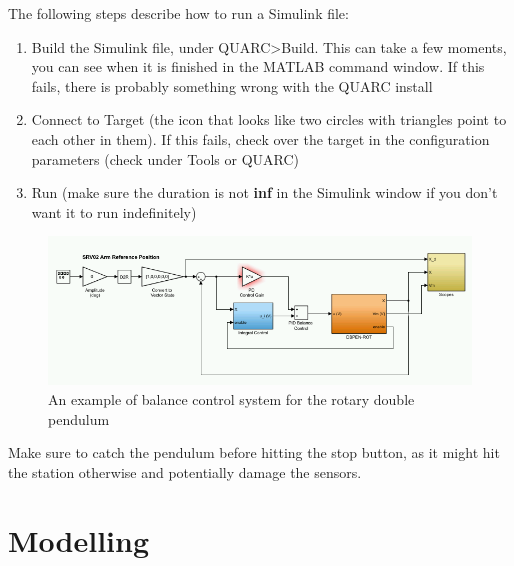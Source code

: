 \documentclass[12pt,letterpaper]{article}
\begin{document}
The following steps describe how to run a Simulink file:

\begin{enumerate}
    \item Build the Simulink file, under QUARC>Build. This can take a few moments, you can see when it is finished in the MATLAB command window. If this fails, there is probably something wrong with the QUARC install
    \item Connect to Target (the icon that looks like two circles with triangles point to each other in them). If this fails, check over the target in the configuration parameters (check under Tools or QUARC)
    \item Run (make sure the duration is not \textbf{inf} in the Simulink window if you don’t want it to run indefinitely)
\end{enumerate}

\begin{figure}[H]
\centering
\includegraphics[width=\linewidth]{img/simulink.png}
\caption{An example of balance control system for the rotary double pendulum}
\label{fig:simulink}
\end{figure}

Make sure to catch the pendulum before hitting the stop button, as it might hit the station otherwise and potentially damage the sensors.

\section{Modelling}
\end{document}

